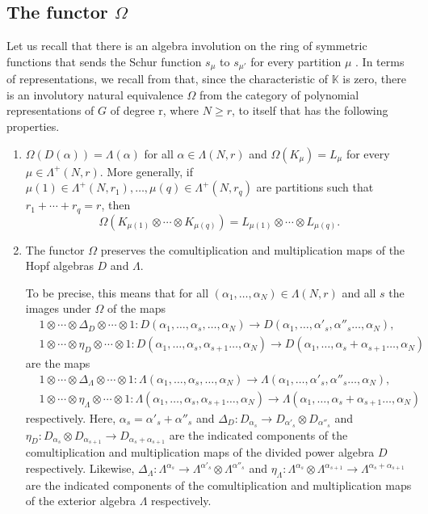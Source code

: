 \documentclass[11pt]{amsart}
\theoremstyle{definition}
\numberwithin{equation}{section}
\begin{document}
\subsection{The functor $\Omega$}\label{Omega}
Let us recall that there is an algebra involution on the ring of symmetric functions that sends the Schur function $s_\mu$ to $s_{\mu'}$ for every partition $\mu$ \cite[6.2]{F}. In terms of representations, we recall from \cite[p. 189]{AB} that, since the characteristic of $\mathbb{K}$ is zero, there is an involutory natural equivalence $\Omega$ from the category of polynomial representations of $G$ of degree r, where $N \ge r$, to itself that has the following properties.  \begin{enumerate} \item $\Omega(D(\alpha)) = \Lambda (\alpha)$ for all $\alpha \in \Lambda(N,r)$ and  $\Omega (K_\mu)=L_\mu$ for every $\mu \in \Lambda^+(N,r)$. More generally, if $\mu(1) \in \Lambda^{+}(N,r_1), \dots, \mu(q) \in \Lambda^{+}(N,r_q)$ are partitions such that $r_1 + \cdots + r_q =r$, then \[\Omega(K_{\mu(1)} \otimes \cdots \otimes K_{\mu(q)} ) = L_{\mu(1)} \otimes \cdots \otimes L_{\mu(q)}.\]\item The functor $\Omega$ preserves the comultiplication and multiplication maps of the Hopf algebras $D$ and $\Lambda$. 
	
	To be precise, this means that for all $(\alpha_1, \dots, \alpha_N) \in \Lambda(N,r)$ and all $s$ the images under $\Omega$ of the maps \begin{align*}&1\otimes \cdots \otimes \Delta_D \otimes \cdots \otimes 1 :D(\alpha_1, \dots, \alpha_s, \dots, \alpha_N) \to D(\alpha_1, \dots, \alpha'_s, \alpha''_s \dots, \alpha_N), \\&
		1\otimes \cdots \otimes \eta_D \otimes \cdots \otimes 1 :D(\alpha_1, \dots, \alpha_s, \alpha_{s+1} \dots, \alpha_N) \to D(\alpha_1, \dots, \alpha_s +\alpha_{s+1} \dots, \alpha_N)
		\end{align*}
are the maps
\begin{align*}&1\otimes \cdots \otimes \Delta_{\Lambda} \otimes \cdots \otimes 1 :\Lambda(\alpha_1, \dots, \alpha_s, \dots, \alpha_N) \to \Lambda(\alpha_1, \dots, \alpha'_s, \alpha''_s \dots, \alpha_N), \\&
	1\otimes \cdots \otimes \eta_{\Lambda} \otimes \cdots \otimes 1 :\Lambda(\alpha_1, \dots, \alpha_s, \alpha_{s+1} \dots, \alpha_N) \to \Lambda(\alpha_1, \dots, \alpha_s +\alpha_{s+1} \dots, \alpha_N)
\end{align*}
respectively. Here, $\alpha_s = \alpha'_s +\alpha''_s$ and $\Delta_D :D_{\alpha_s} \to D_{\alpha'_s} \otimes D_{\alpha''_s}$ 	and $\eta_D: D_{\alpha_s} \otimes D_{\alpha_{s+1}} \to D_{\alpha_s +\alpha_{s+1}}$
are the indicated components of the comultiplication and multiplication maps of the divided power algebra $D$ respectively. Likewise, $\Delta_\Lambda :\Lambda^{\alpha_s} \to \Lambda^{\alpha'_s} \otimes \Lambda^{\alpha''_s}$ 	and $\eta_\Lambda: \Lambda^{\alpha_s} \otimes \Lambda^{\alpha_{s+1}} \to \Lambda^{\alpha_s +\alpha_{s+1}}$
are the indicated components of the comultiplication and multiplication maps of the exterior algebra $\Lambda$ respectively.	
	

\end{enumerate}
\end{document}

